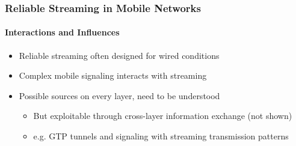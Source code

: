 \documentclass{beamer}
\begin{document}
\begin{frame}
	\frametitle{Reliable Streaming in Mobile Networks}
	\framesubtitle{Interactions and Influences}

	\begin{itemize}
		\item Reliable streaming often designed for wired conditions
		\item Complex mobile signaling interacts with streaming %
		\item Possible sources on every layer, need to be understood
		\begin{itemize}
			\item But exploitable through cross-layer information exchange (not shown)
			\item e.g. GTP tunnels and signaling with streaming transmission patterns
		\end{itemize}
	\end{itemize}




\end{frame}
\end{document}
